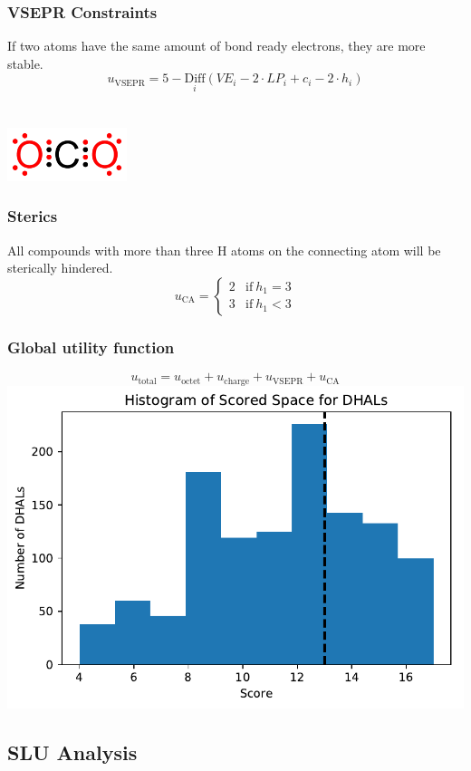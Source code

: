 \documentclass[xcolor=dvipsnames]{beamer}
\begin{document}
\begin{frame}
\frametitle{VSEPR Constraints}
If two atoms have the same amount of bond ready electrons, they are more stable.
\begin{equation}
u_{\textrm{VSEPR}} =  5-\underset{i}{\textrm{Diff}} \left( VE_i - 2 \cdot LP_i + c_i - 2 \cdot h_i \right)
\end{equation}
~\\
~\\
\includegraphics[width=3.5cm]{img/octet2.png}
\centering
\end{frame}


\begin{frame}
\frametitle{Sterics}
All compounds with more than three H atoms on the connecting atom will be sterically hindered.
\begin{equation}
u_{\textrm{CA}} = 
\begin{cases}
2	&	\mathrm{if}~ h_1 = 3 \\
3   &	\mathrm{if}~ h_1 < 3
\end{cases}
\end{equation}
\end{frame}

\begin{frame}
\frametitle{Global utility function}
\begin{equation}
u_{\textrm{total}} = u_{\textrm{octet}} + u_{\textrm{charge}} + u_{\textrm{VSEPR}} + u_{\textrm{CA}}
\end{equation}
\includegraphics[width=0.65\linewidth]{img/dhal_ss_hist.pdf} 
\centering
\end{frame}

\subsection{SLU Analysis}
\end{document}
